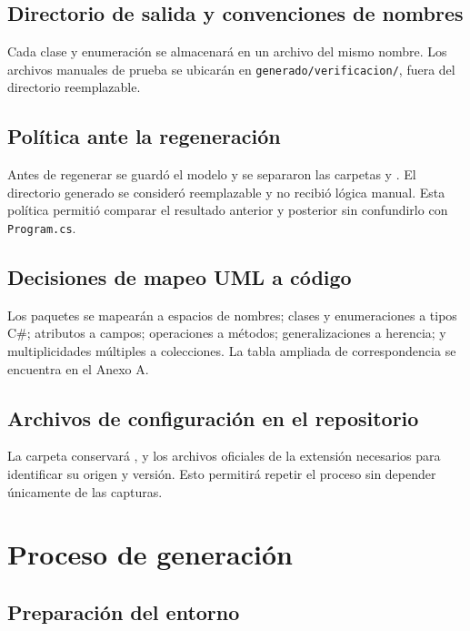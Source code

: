 \documentclass[12pt,a4paper]{article}
\begin{document}
\subsection{Directorio de salida y convenciones de nombres}

Cada clase y enumeración se almacenará en un archivo del mismo nombre. Los
archivos manuales de prueba se ubicarán en
\texttt{generado/verificacion/}, fuera del directorio reemplazable.

\subsection{Política ante la regeneración}

Antes de regenerar se guardó el modelo y se separaron las carpetas
 y . El directorio generado se
consideró reemplazable y no recibió lógica manual. Esta política permitió
comparar el resultado anterior y posterior sin confundirlo con
\texttt{Program.cs}.

\subsection{Decisiones de mapeo UML a código}

Los paquetes se mapearán a espacios de nombres; clases y enumeraciones a tipos
C\#; atributos a campos; operaciones a métodos; generalizaciones a herencia;
y multiplicidades múltiples a colecciones. La tabla ampliada de
correspondencia se encuentra en el Anexo A.

\subsection{Archivos de configuración en el repositorio}

La carpeta  conservará
,  y los
archivos oficiales de la extensión necesarios para identificar su origen y
versión. Esto permitirá repetir el proceso sin depender únicamente de las
capturas.


\section{Proceso de generación}

\subsection{Preparación del entorno}
\end{document}
